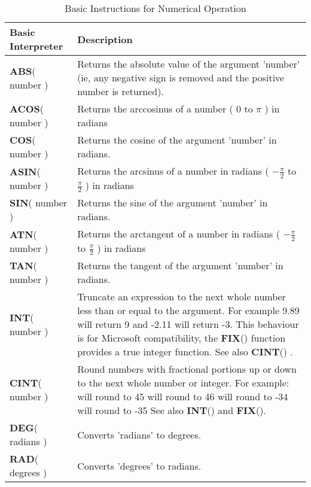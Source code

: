 \begin{table}[]
\centering
\caption{Basic Instructions for Numerical Operation}
\label{Basic_Instructions_for_Numerical_Operation}
\begin{tabular}{|p{4cm}|p{10cm}|}
\hline
\textbf{Basic Interpreter} & \textbf{Description}                                                             \\ \hline
\textbf{ABS}( number ) 
& Returns the absolute value of the argument 'number' (ie, any negative sign is removed and the positive number is returned).
\\ \hline
\textbf{ACOS}( number ) 
& Returns the arccosinus of a number ( $0$ to $\pi$ ) in radians
\\ \hline
\textbf{COS}( number ) & Returns the cosine of the argument 'number' in radians.
\\ \hline
\textbf{ASIN}( number ) 
& Returns the arcsinus of a number in radians ( $-\frac{\pi}{2}$ to $\frac{\pi}{2}$ ) in radians
\\ \hline
\textbf{SIN}( number ) & Returns the sine of the argument 'number' in radians.
\\ \hline
\textbf{ATN}( number ) 
& Returns the arctangent of a number in radians ( $-\frac{\pi}{2}$ to $\frac{\pi}{2}$ ) in radians
\\ \hline
\textbf{TAN}( number ) & Returns the tangent of the argument 'number' in radians.
\\ \hline
\textbf{INT}( number ) & Truncate an expression to the next whole number less than or equal to
the argument. For example 9.89 will return 9 and -2.11 will return -3.
This behaviour is for Microsoft compatibility, the \textbf{FIX}() function
provides a true integer function.
See also \textbf{CINT}() .
\\ \hline
\textbf{CINT}( number ) & Round numbers with fractional portions up or down to the next whole number or integer.\newline
For example:\newline
45.47 will round to 45\newline
45.57 will round to 46\newline
-34.45 will round to -34\newline
-34.55 will round to -35\newline
See also \textbf{INT}() and \textbf{FIX}().
\\ \hline
\textbf{DEG}( radians ) & Converts 'radians' to degrees.
\\ \hline
\textbf{RAD}( degrees ) & Converts 'degrees' to radians.

\end{tabular}
\end{table}

